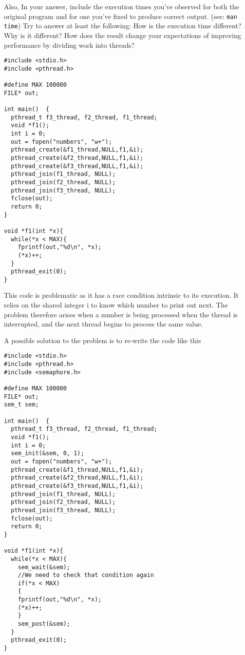 \documentclass[12pt]{article}
\begin{document}
\begin{enumerate}
  Also, In your answer, include the execution times you've observed for both
  the original program and for one you've fixed to produce correct
  output. (see: \verb$man time$) Try to answer at least the following:
  How is the execution time different? Why is it different? How does
  the result change your expectations of improving performance by
  dividing work into threads?

\begin{Verbatim}[fontsize=\scriptsize]
#include <stdio.h>
#include <pthread.h>

#define MAX 100000
FILE* out;

int main()  {
  pthread_t f3_thread, f2_thread, f1_thread;
  void *f1();
  int i = 0;
  out = fopen("numbers", "w+");
  pthread_create(&f1_thread,NULL,f1,&i);
  pthread_create(&f2_thread,NULL,f1,&i);
  pthread_create(&f3_thread,NULL,f1,&i);
  pthread_join(f1_thread, NULL);
  pthread_join(f2_thread, NULL);
  pthread_join(f3_thread, NULL);
  fclose(out);
  return 0;
}

void *f1(int *x){
  while(*x < MAX){
    fprintf(out,"%d\n", *x);
    (*x)++;
  }
  pthread_exit(0);
}
\end{Verbatim}

This code is problematic as it has a race condition intrinsic to its execution. It relies on the shared integer i to
know which number to print out next. The problem therefore arises when a number is being processed when the thread is interrupted,
and the next thread begins to process the same value.

A possible solution to the problem is to re-write the code like this
\begin{Verbatim}[fontsize=\scriptsize]
#include <stdio.h>
#include <pthread.h>
#include <semaphore.h>

#define MAX 100000
FILE* out;
sem_t sem;

int main()  {
  pthread_t f3_thread, f2_thread, f1_thread;
  void *f1();
  int i = 0; 
  sem_init(&sem, 0, 1);
  out = fopen("numbers", "w+");
  pthread_create(&f1_thread,NULL,f1,&i);
  pthread_create(&f2_thread,NULL,f1,&i);
  pthread_create(&f3_thread,NULL,f1,&i);
  pthread_join(f1_thread, NULL);
  pthread_join(f2_thread, NULL);
  pthread_join(f3_thread, NULL);
  fclose(out);
  return 0;
}

void *f1(int *x){
  while(*x < MAX){
    sem_wait(&sem);
    //We need to check that condition again
    if(*x < MAX)
    {
	fprintf(out,"%d\n", *x);
	(*x)++;
    }
    sem_post(&sem);
  }
  pthread_exit(0);
}
\end{Verbatim}


\end{enumerate}
\end{document}
